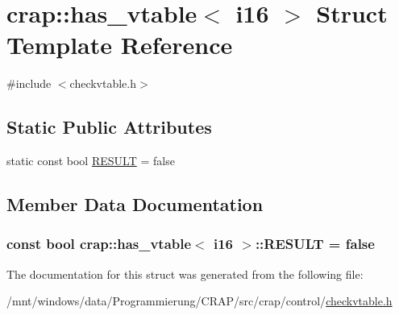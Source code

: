 \hypertarget{structcrap_1_1has__vtable_3_01i16_01_4}{\section{crap\-:\-:has\-\_\-vtable$<$ i16 $>$ Struct Template Reference}
\label{structcrap_1_1has__vtable_3_01i16_01_4}
}


{\ttfamily \#include $<$checkvtable.\-h$>$}

\subsection*{Static Public Attributes}
\begin{DoxyCompactItemize}
\item 
static const bool \hyperlink{structcrap_1_1has__vtable_3_01i16_01_4_a660892f8feaf9d934ab8d3d202f65b8a}{R\-E\-S\-U\-L\-T} = false
\end{DoxyCompactItemize}


\subsection{Member Data Documentation}
\hypertarget{structcrap_1_1has__vtable_3_01i16_01_4_a660892f8feaf9d934ab8d3d202f65b8a}{
\subsubsection[{R\-E\-S\-U\-L\-T}]{\setlength{\rightskip}{0pt plus 5cm}const bool {\bf crap\-::has\-\_\-vtable}$<$ {\bf i16} $>$\-::R\-E\-S\-U\-L\-T = false\hspace{0.3cm}{\ttfamily [static]}}}\label{structcrap_1_1has__vtable_3_01i16_01_4_a660892f8feaf9d934ab8d3d202f65b8a}


The documentation for this struct was generated from the following file\-:\begin{DoxyCompactItemize}
\item 
/mnt/windows/data/\-Programmierung/\-C\-R\-A\-P/src/crap/control/\hyperlink{checkvtable_8h}{checkvtable.\-h}\end{DoxyCompactItemize}
